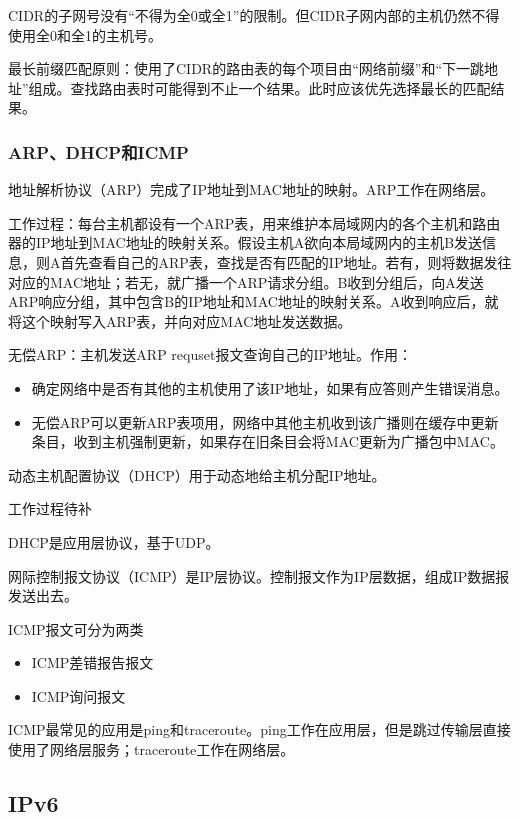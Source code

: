\documentclass[12pt, a4paper, oneside]{ctexart}
\begin{document}
CIDR的子网号没有“不得为全0或全1”的限制。但CIDR子网内部的主机仍然不得使用全0和全1的主机号。

最长前缀匹配原则：使用了CIDR的路由表的每个项目由“网络前缀”和“下一跳地址”组成。查找路由表时可能得到不止一个结果。此时应该优先选择最长的匹配结果。

\subsubsection{ARP、DHCP和ICMP}

地址解析协议（ARP）完成了IP地址到MAC地址的映射。ARP工作在网络层。

工作过程：每台主机都设有一个ARP表，用来维护本局域网内的各个主机和路由器的IP地址到MAC地址的映射关系。假设主机A欲向本局域网内的主机B发送信息，则A首先查看自己的ARP表，查找是否有匹配的IP地址。若有，则将数据发往对应的MAC地址；若无，就广播一个ARP请求分组。B收到分组后，向A发送ARP响应分组，其中包含B的IP地址和MAC地址的映射关系。A收到响应后，就将这个映射写入ARP表，并向对应MAC地址发送数据。

无偿ARP：主机发送ARP requset报文查询自己的IP地址。作用：
\begin{itemize}
    \item 确定网络中是否有其他的主机使用了该IP地址，如果有应答则产生错误消息。
    \item 无偿ARP可以更新ARP表项用，网络中其他主机收到该广播则在缓存中更新条目，收到主机强制更新，如果存在旧条目会将MAC更新为广播包中MAC。
\end{itemize}

动态主机配置协议（DHCP）用于动态地给主机分配IP地址。

工作过程待补

DHCP是应用层协议，基于UDP。

网际控制报文协议（ICMP）是IP层协议。控制报文作为IP层数据，组成IP数据报发送出去。

ICMP报文可分为两类
\begin{itemize}
    \item ICMP差错报告报文
    \item ICMP询问报文
\end{itemize}

ICMP最常见的应用是ping和traceroute。ping工作在应用层，但是跳过传输层直接使用了网络层服务；traceroute工作在网络层。

\subsection{IPv6}
\end{document}
